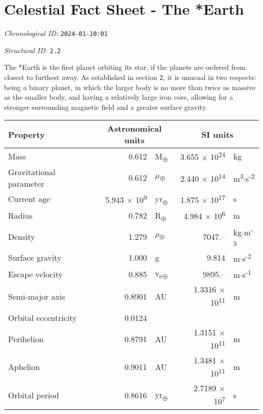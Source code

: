 \section{Celestial Fact Sheet - The *Earth}
\emph{Chronological ID:} \texttt{2024-01-10:01}

\emph{Structural ID:} \texttt{2.2}

The *Earth is the first planet orbiting its star, if the planets are ordered from closest to furthest away. As established in section \texttt{2}, it is unusual in two respects: being a binary planet, in which the larger body is no more than twice as massive as the smaller body, and having a relatively large iron core, allowing for a stronger surrounding magnetic field and a greater surface gravity.

\begin{tabular}{|p{4cm}|r l|r l|}
  \hline
  Property & \multicolumn{2}{c|}{Astronomical units} & \multicolumn{2}{c|}{SI units} \\
  \hline \hline
  Mass & 0.612 & M\textsubscript{$\oplus$} & 3.655 $\times$ 10\textsuperscript{24} & kg \\
  Gravitational parameter & 0.612 & $\mu$\textsubscript{$\oplus$} & 2.440 $\times$ 10\textsuperscript{14} & m\textsuperscript{3}$\cdot$s\textsuperscript{-2} \\
  Current age & 5.943 $\times$ 10\textsuperscript{9} & yr\textsubscript{$\oplus$} & 1.875 $\times$ 10\textsuperscript{17} & s \\
  Radius & 0.782 & R\textsubscript{$\oplus$} & 4.984 $\times$ 10\textsuperscript{6} & m \\
  Density & 1.279 & $\rho$\textsubscript{$\oplus$} & 7047.-- & kg$\cdot$m\textsuperscript{-3} \\
  Surface gravity & 1.000 & g & 9.814 & m$\cdot$s\textsuperscript{-2} \\
  Escape velocity & 0.885 & v\textsubscript{e$\oplus$} & 9895.-- & m$\cdot$s\textsuperscript{-1} \\
  Semi-major axis & 0.8901 & AU & 1.3316 $\times$ 10\textsuperscript{11} & m \\
  Orbital eccentricity & 0.0124 & & & \\
  Perihelion & 0.8791 & AU & 1.3151 $\times$ 10\textsuperscript{11} & m \\
  Aphelion & 0.9011 & AU & 1.3481 $\times$ 10\textsuperscript{11} & m \\
  Orbital period & 0.8616 & yr\textsubscript{$\oplus$} & 2.7189 $\times$ 10\textsuperscript{7} & s \\

\end{tabular}
